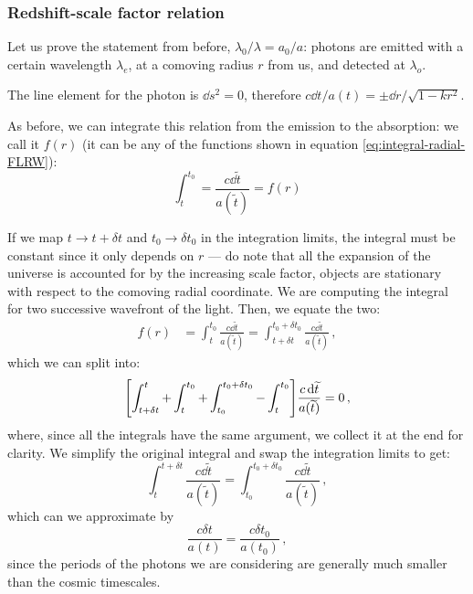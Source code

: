 \documentclass[main.tex]{subfiles}
\begin{document}
\subsubsection{Redshift-scale factor relation}

Let us prove the statement from before, \(\lambda_0 / \lambda  = a_0 / a\):
photons are emitted with a certain wavelength \(\lambda_{e}\), at a comoving radius \(r\) from us, and detected at \(\lambda_{o}\).

The line element for the photon is \(\dd{s^2} =0\), therefore \(c\dd{t}/ a(t) = \pm \dd{r} / \sqrt{1-kr^2} \).

As before, we can integrate this relation from the emission to the absorption: we call it \(f(r)\) (it can be any of the functions shown in equation \eqref{eq:integral-radial-FLRW}):
\begin{equation}
  \int_{t}^{t_0 } = \frac{c\dd{\widetilde{t}}}{a(\widetilde{t})} = f(r)
\end{equation}

If we map \(t \rightarrow t + \delta t\) and \(t_0 \rightarrow \delta t_0 \) in the integration limits, the integral must be constant since it only depends on \(r\) --- do note that all the expansion of the universe is accounted for by the increasing scale factor, objects are stationary with respect to the comoving radial coordinate.
We are computing the integral for two successive wavefront of the light.
Then, we equate the two: 
%
\begin{align}
f(r) &= \int_{t}^{t_0 } \frac{c \dd{\widetilde{t} }}{a(\widetilde{t})} = \int_{t+\delta t}^{t_0 + \delta t_0 } \frac{c \dd{\widetilde{t} }}{a(\widetilde{t})}
\,,
\end{align}
%
which we can split into: 
%
\begin{align}
\qty[\int_{t+ \delta t}^{t} + \int_{t}^{t_0} + \int_{t_0 }^{t_0 + \delta t_0 } - \int_{t}^{t_0 }] \frac{c \dd{\widetilde{t}}}{a(\widetilde{t})} = 0
\,,
\end{align}
%
where, since all the integrals have the same argument, we collect it at the end for clarity.
We simplify the original integral and swap the integration limits to get:
\begin{equation}
  \int_{t}^{t + \delta t} \frac{c\dd{\widetilde{t}}}{a(\widetilde{t})} = \int_{t_0 }^{t_0 + \delta t_0 } \frac{c\dd{\widetilde{t}}}{a(\widetilde{t})}\,,
\end{equation}
%
which can we approximate by
\begin{equation}
\frac{c \delta t}{a(t)} =   \frac{c \delta t_0 }{a(t_0 )}\,,
\end{equation}
%
since the periods of the photons we are considering are generally much smaller than the cosmic timescales.
\end{document}
